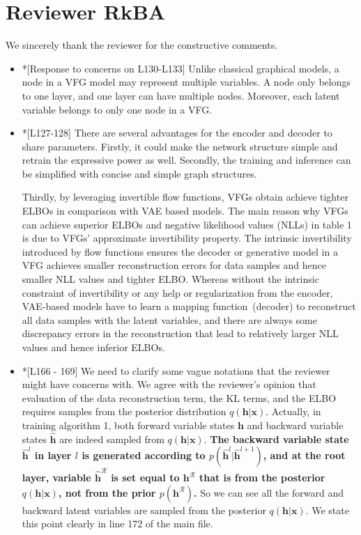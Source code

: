 \documentclass{article}
\begin{document}
\section{Reviewer RkBA}
We sincerely thank the reviewer for the constructive comments. 

\begin{itemize}
\item *[Response to concerns on L130-L133]	Unlike classical graphical models, a node in a VFG model may represent multiple variables. A node only belongs to one layer, and one layer can have multiple nodes. Moreover, each latent variable belongs to only one node in a VFG. 

\item *[L127-128] There are several advantages for the encoder and decoder to share parameters. Firstly, it could make the network structure simple and retrain the expressive power as well. Secondly, the training and inference can be simplified with concise and simple graph structures. 

Thirdly, by leveraging invertible flow functions, VFGs obtain achieve tighter ELBOs in comparison with VAE based models. The main reason why VFGs can achieve superior ELBOs and negative likelihood values (NLLs) in table 1 is due to VFGs' approximate invertibility property. The intrinsic invertibility introduced by flow functions ensures the decoder or generative model in a VFG  achieves smaller reconstruction errors for data samples and hence smaller NLL values and tighter ELBO. Whereas without the intrinsic constraint of invertibility or any help or regularization from the encoder, VAE-based models have to learn a  mapping function~(decoder) to reconstruct all data samples with the latent variables, and there are always some discrepancy errors in the reconstruction that lead to relatively larger NLL values and hence inferior ELBOs.

\item *[L166 - 169] We need to clarify some vague notations that the reviewer might have concerns with.    We agree with the reviewer's opinion that evaluation of the data reconstruction term, the KL terms, and the ELBO  requires samples from the posterior distribution $q(\mathbf{h}|\mathbf{x})$. 
Actually, in training algorithm 1, both forward variable states $\mathbf{h}$ and backward variable states  $\widehat{\mathbf{h}}$ are indeed sampled from $q(\mathbf{h}|\mathbf{x})$. \textbf{The backward variable state $\widehat{\mathbf{h}}^l$ in  layer $l$  is generated according to $p(\widehat{\mathbf{h}}^l | \widehat{\mathbf{h}}^{l+1})$, and at the root  layer,  variable $\widehat{\mathbf{h}}^{\mathcal{R}}$ is set  equal to  $\mathbf{h}^{\mathcal{R}}$ that is
from  the posterior $q(\mathbf{h}|\mathbf{x})$, not from the prior $p(\mathbf{h}^{\mathcal{R}})$.} So we can see all the forward and backward latent variables are sampled from the posterior $q(\mathbf{h}|\mathbf{x})$. 
We state this point clearly in line 172 of the main file.


\end{itemize}
\end{document}

